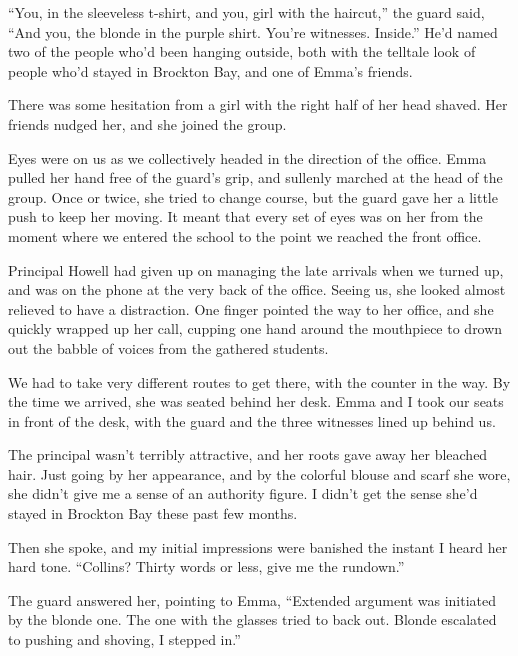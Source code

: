 ``You, in the sleeveless t-shirt, and you, girl with the haircut,'' the guard said, ``And you, the blonde in the purple shirt.  You're witnesses.  Inside.''  He'd named two of the people who'd been hanging outside, both with the telltale look of people who'd stayed in Brockton Bay, and one of Emma's friends.



There was some hesitation from a girl with the right half of her head shaved.  Her friends nudged her, and she joined the group.



Eyes were on us as we collectively headed in the direction of the office.  Emma pulled her hand free of the guard's grip, and sullenly marched at the head of the group.  Once or twice, she tried to change course, but the guard gave her a little push to keep her moving.  It meant that every set of eyes was on her from the moment where we entered the school to the point we reached the front office.



Principal Howell had given up on managing the late arrivals when we turned up, and was on the phone at the very back of the office.  Seeing us, she looked almost relieved to have a distraction.  One finger pointed the way to her office, and she quickly wrapped up her call, cupping one hand around the mouthpiece to drown out the babble of voices from the gathered students.



We had to take very different routes to get there, with the counter in the way.  By the time we arrived, she was seated behind her desk.  Emma and I took our seats in front of the desk, with the guard and the three witnesses lined up behind us.



The principal wasn't terribly attractive, and her roots gave away her bleached hair.  Just going by her appearance, and by the colorful blouse and scarf she wore, she didn't give me a sense of an authority figure.  I didn't get the sense she'd stayed in Brockton Bay these past few months.



Then she spoke, and my initial impressions were banished the instant I heard her hard tone.  ``Collins?  Thirty words or less, give me the rundown.''



The guard answered her, pointing to Emma, ``Extended argument was initiated by the blonde one.  The one with the glasses tried to back out.  Blonde escalated to pushing and shoving, I stepped in.''



